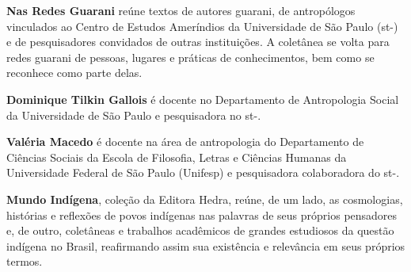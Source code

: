 \textbf{Nas Redes Guarani} reúne textos de autores guarani, de antropólogos vinculados ao Centro de Estudos Ameríndios da Universidade de São Paulo (st-) e de pesquisadores convidados de outras instituições. A coletânea se volta para redes guarani de pessoas, lugares e práticas de conhecimentos, bem como se reconhece como parte delas.

\textbf{Dominique Tilkin Gallois} é docente no Departamento de Antropologia Social da Universidade de São Paulo e pesquisadora no st-.

\textbf{Valéria Macedo} é docente na área de antropologia do Departamento de Ciências Sociais da Escola de Filosofia, Letras e Ciências Humanas da Universidade Federal de São Paulo (Unifesp) e pesquisadora colaboradora do st-.

\textbf{Mundo Indígena}, coleção da Editora Hedra, reúne, de um lado, as cosmologias, histórias
e reflexões de povos indígenas nas palavras de seus próprios pensadores e, de outro, coletâneas
e trabalhos acadêmicos de grandes estudiosos da questão indígena no Brasil, reafirmando assim sua
existência e relevância em seus próprios termos.\par